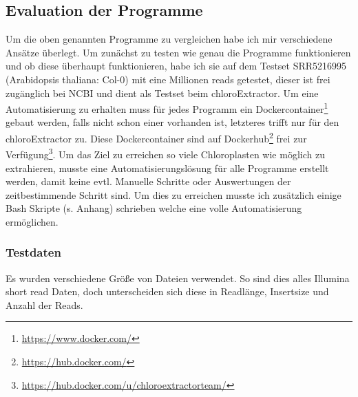 \documentclass{scrartcl}
\begin{document}
\subsection{Evaluation der Programme}
\label{sec-3-1}
Um die oben genannten Programme zu vergleichen habe ich mir verschiedene Ansätze überlegt.
Um zunächst zu testen wie genau die Programme funktionieren und ob diese überhaupt funktionieren,
habe ich sie auf dem Testset SRR5216995 (Arabidopsis thaliana: Col-0) mit eine Millionen reads getestet, 
dieser ist frei zugänglich bei NCBI und dient als Testset beim chloroExtractor\footnotemark[9]{}. Um eine 
Automatisierung zu erhalten muss für jedes Programm ein Dockercontainer\footnote{\url{https://www.docker.com/}} gebaut werden, falls nicht 
schon einer vorhanden ist, letzteres trifft nur für den chloroExtractor zu. Diese Dockercontainer sind auf Dockerhub\footnote{\url{https://hub.docker.com/}} frei
zur Verfügung\footnote{\url{https://hub.docker.com/u/chloroextractorteam/}}. Um das Ziel zu erreichen
so viele Chloroplasten wie möglich zu extrahieren, musste eine Automatisierungslösung für alle Programme
erstellt werden, damit keine evtl. Manuelle Schritte oder Auswertungen der zeitbestimmende Schritt sind.
Um dies zu erreichen musste ich zusätzlich einige Bash Skripte (s. Anhang) schrieben welche eine volle
Automatisierung ermöglichen.   

\subsubsection{Testdaten}
\label{sec-3-1-1}
Es wurden verschiedene Größe von Dateien verwendet. So sind dies alles Illumina short read Daten, doch unterscheiden sich diese in Readlänge, Insertsize und Anzahl der Reads.
\end{document}
